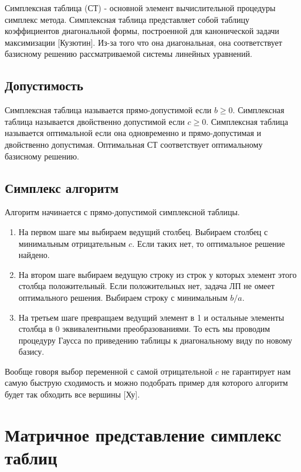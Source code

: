 \documentclass[a4paper,article,14pt]{extarticle}
\begin{document}
Симплексная таблица (СТ) - основной элемент вычислительной процедуры симплекс метода.
Симплексная таблица представляет собой таблицу коэффициентов диагональной формы, построенной для канонической задачи максимизации [Кузютин].
Из-за того что она диагональная, она соответствует базисному решению рассматриваемой системы линейных уравнений.

\subsection{Допустимость}

Симплексная таблица называется прямо-допустимой если \(b \ge 0\).
Симплексная таблица называется двойственно допустимой если \(c \ge 0\).
Симплексная таблица называется оптимальной если она одновременно и прямо-допустимая и двойственно допустимая.
Оптимальная СТ соответствует оптимальному базисному решению.

\subsection{Симплекс алгоритм}

Алгоритм начинается с прямо-допустимой симплексной таблицы.

\begin{enumerate}
    \item
        На первом шаге мы выбираем ведущий столбец.
        Выбираем столбец с минимальным отрицательным \(c\).
        Если таких нет, то оптимальное решение найдено.
    \item
        На втором шаге выбираем ведущую строку из строк у которых элемент этого столбца положительный.
        Если положительных нет, задача ЛП не омеет оптимального решения.
        Выбираем строку с минимальным \(b/a\).
    \item
        На третьем шаге превращаем ведущий элемент в 1 и остальные элементы столбца в 0 эквивалентными преобразованиями.
        То есть мы проводим процедуру Гаусса по приведению таблицы к диагональному виду по новому базису.
\end{enumerate}

Вообще говоря выбор переменной с самой отрицательной \(c\) не гарантирует нам самую быструю сходимость и можно подобрать пример для которого алгоритм будет так обходить все вершины [Ху].

\newpage

\section{Матричное представление симплекс таблиц}
\end{document}
